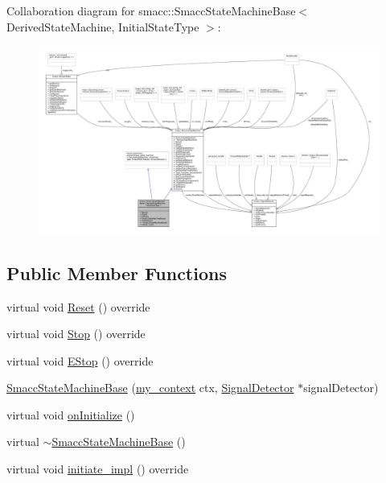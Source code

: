 Collaboration diagram for smacc\+:\+:Smacc\+State\+Machine\+Base$<$ Derived\+State\+Machine, Initial\+State\+Type $>$\+:
\nopagebreak
\begin{figure}[H]
\begin{center}
\leavevmode
\includegraphics[width=350pt]{structsmacc_1_1SmaccStateMachineBase__coll__graph}
\end{center}
\end{figure}
\subsection*{Public Member Functions}
\begin{DoxyCompactItemize}
\item 
virtual void \hyperlink{structsmacc_1_1SmaccStateMachineBase_a150ec7ab023a6d1d028387b2da907e9d}{Reset} () override
\item 
virtual void \hyperlink{structsmacc_1_1SmaccStateMachineBase_a9c7c7b8d814a8cb1b741c7675dc2a9f7}{Stop} () override
\item 
virtual void \hyperlink{structsmacc_1_1SmaccStateMachineBase_af1d145820c98089389e7de97a6744231}{E\+Stop} () override
\item 
\hyperlink{structsmacc_1_1SmaccStateMachineBase_a47508a2d301007546d4c70dedd2ade4b}{Smacc\+State\+Machine\+Base} (\hyperlink{common_8h_af2dcacead80d69b96952496fe413bbfe}{my\+\_\+context} ctx, \hyperlink{classsmacc_1_1SignalDetector}{Signal\+Detector} $\ast$signal\+Detector)
\item 
virtual void \hyperlink{structsmacc_1_1SmaccStateMachineBase_a50b87e60fe9d1ed4dddd703ccf1390ae}{on\+Initialize} ()
\item 
virtual \hyperlink{structsmacc_1_1SmaccStateMachineBase_af08edc30fb749631b5459eb7438129ec}{$\sim$\+Smacc\+State\+Machine\+Base} ()
\item 
virtual void \hyperlink{structsmacc_1_1SmaccStateMachineBase_a2dc1cd9a25b80f00602f1faab9b01e7b}{initiate\+\_\+impl} () override
\end{DoxyCompactItemize}
